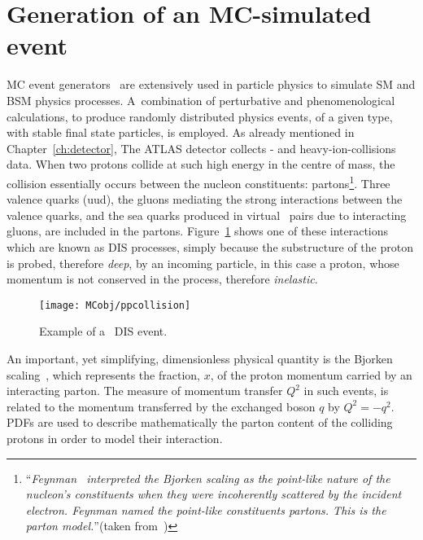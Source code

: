 	\section{Generation of an MC-simulated event}
	\label{sec:evGen}

		\ac{MC} event generators~\cite{Buckley:2011ms} are extensively used in particle physics to simulate \ac{SM} and \ac{BSM} physics processes. A combination of perturbative and phenomenological calculations, to produce randomly distributed physics events, of a given type, with stable final state particles, is employed. As already mentioned in Chapter~\ref{ch:detector}, The \ac{ATLAS} detector collects \pp- and heavy-ion-collisions data. When two protons collide at such high energy in the centre of mass, the collision essentially occurs between the nucleon constituents: partons\footnote{``\emph{Feynman~\cite{PhysRevLett.23.1415} interpreted the Bjorken scaling as the point-like nature of the nucleon's constituents when they were incoherently scattered by the incident electron. Feynman named the point-like constituents partons. This is the parton model.}''(taken from~\cite{Yan:2014kna})}. Three valence quarks (uud), the gluons mediating the strong interactions between the valence quarks, and the sea quarks produced in virtual \qqbar\ pairs due to interacting gluons, are included in the partons. Figure~\ref{fig:DIS} shows one of these interactions which are known as \ac{DIS} processes, simply because the substructure of the proton is probed, therefore \emph{deep}, by an incoming particle, in this case a proton, whose momentum is not conserved in the process, therefore \emph{inelastic}.

		\begin{figure}[!htb]
			\centering
			\texttt{[image: MCobj/ppcollision]}
			\caption{\label{fig:DIS} Example of a \pp\ \ac{DIS} event.}
		\end{figure}

		An important, yet simplifying, dimensionless physical quantity is the Bjorken scaling~\cite{PhysRev.179.1547}, which represents the fraction, $x$, of the proton momentum carried by an interacting parton. The measure of momentum transfer $Q^2$ in such events, is related to the momentum transferred by the exchanged boson $q$ by $Q^2 = -q^2$. \acp{PDF} are used to describe mathematically the parton content of the colliding protons in order to model their interaction.  

